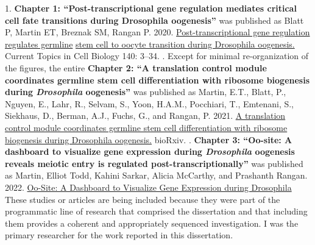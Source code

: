 \documentclass[12pt,oneside]{reedthesis}
\begin{document}
  \begin{attribution}
  \pagestyle{plain}
    1. \textbf{Chapter 1: ``Post-transcriptional gene regulation mediates critical cell fate transitions during Drosophila oogenesis''} was published as Blatt P, Martin ET, Breznak SM, Rangan P. 2020. \underline{Post-transcriptional gene regulation regulates germline} \underline{stem cell to oocyte transition during Drosophila oogenesis.} Current Topics in Cell Biology 140: 3--34.
    \newline {}. Except for minimal re-organization of the figures, the entire \textbf{Chapter 2: ``A translation control module coordinates germline stem cell differentiation with ribosome biogenesis during \emph{Drosophila} oogenesis''} was published as Martin, E.T., Blatt, P., Nguyen, E., Lahr, R., Selvam, S., Yoon, H.A.M., Pocchiari, T., Emtenani, S., Siekhaus, D., Berman, A.J., Fuchs, G., and Rangan, P. 2021. \underline{A translation control module coordinates germline stem cell differentiation with ribosome} \underline{biogenesis during Drosophila oogenesis.} bioRxiv.
    \newline {}. \textbf{Chapter 3: ``Oo-site: A dashboard to visualize gene expression during \emph{Drosophila} oogenesis reveals meiotic entry is regulated post-transcriptionally''} was published as Martin, Elliot Todd, Kahini Sarkar, Alicia McCarthy, and Prashanth Rangan. 2022. \underline{Oo-Site: A Dashboard to Visualize Gene Expression during Drosophila}
    \newline \newline
    These studies or articles are being included because they were part of the programmatic line of research that comprised the dissertation and that including them provides a coherent and appropriately sequenced investigation.
    \newline \newline
    I was the primary researcher for the work reported in this dissertation.
  \end{attribution}
  \hypersetup{linkcolor=black}
  \setcounter{secnumdepth}{2}
  \setcounter{tocdepth}{2}
  \pagestyle{plain}
  \tableofcontents


  \listoffigures
  \pagestyle{plain}

\mainmatter %
\pagestyle{plain} %

\end{document}
